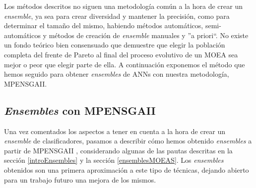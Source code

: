 Los métodos descritos no siguen una metodología común a la hora de crear un
\textit{ensemble}, ya sea para crear diversidad y mantener la precisión, como para
determinar el tamaño del mismo, habiendo métodos automáticos, semi-automáticos y
métodos de creación de \textit{ensemble} manuales y ''a priori``. No existe un fondo
teórico bien consensuado que demuestre que elegir la población completa del frente de
Pareto al final del proceso evolutivo de un MOEA sea mejor o peor que elegir parte de
ella. A continuación exponemos el método que hemos seguido para obtener \textit{ensembles}
de ANNs con nuestra metodología, MPENSGAII.

\subsection{\textit{Ensembles} con MPENSGAII}
Una vez comentados los aspectos a tener en cuenta a la hora de crear un \textit{ensemble}
de clasificadores, pasamos a describir cómo hemos obtenido \textit{ensembles} a partir
de MPENSGAII \cite{Fernandez2009b}, considerando algunas de las pautas descritas en
la sección \ref{introEnsembles} y la sección \ref{ensemblesMOEAS}. Los \textit{ensembles}
obtenidos son una primera aproximación a este tipo de técnicas, dejando abierto para un
trabajo futuro una mejora de los mismos.

